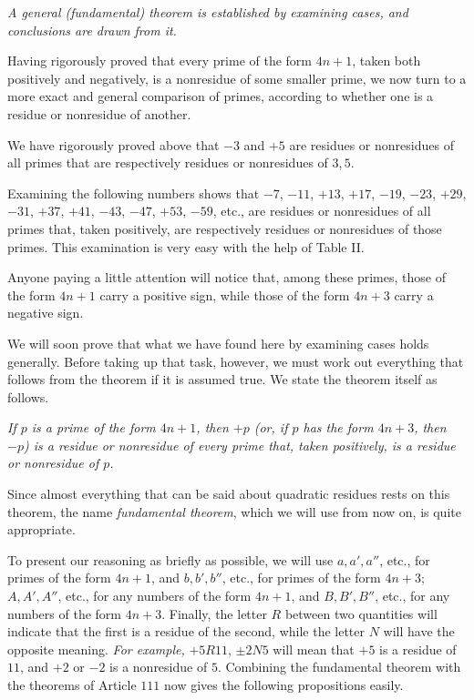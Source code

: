 \begin{center}\textit{A general (fundamental) theorem is established by examining cases, and conclusions are drawn from it.}\end{center}

Having rigorously proved that every prime of the form $4n+1$, taken both positively and negatively, is a nonresidue of some smaller prime, we now turn to a more exact and general comparison of primes, according to whether one is a residue or nonresidue of another.

We have rigorously proved above that $-3$ and $+5$ are residues or nonresidues of all primes that are respectively residues or nonresidues of $3, 5$.

Examining the following numbers shows that $-7$, $-11$, $+13$, $+17$, $-19$, $-23$, $+29$, $-31$, $+37$, $+41$, $-43$, $-47$, $+53$, $-59$, etc., are residues or nonresidues of all primes that, taken positively, are respectively residues or nonresidues of those primes. This examination is very easy with the help of Table II.

Anyone paying a little attention will notice that, among these primes, those of the form $4n+1$ carry a positive sign, while those of the form $4n+3$ carry a negative sign.

We will soon prove that what we have found here by examining cases holds generally. Before taking up that task, however, we must work out everything that follows from the theorem if it is assumed true. We state the theorem itself as follows.

\emph{If $p$ is a prime of the form $4n+1$, then $+p$ (or, if $p$ has the form $4n+3$, then $-p$) is a residue or nonresidue of every prime that, taken positively, is a residue or nonresidue of $p$.}

Since almost everything that can be said about quadratic residues rests on this theorem, the name \emph{fundamental theorem}, which we will use from now on, is quite appropriate.

To present our reasoning as briefly as possible, we will use $a, a', a''$, etc., for primes of the form $4n+1$, and $b, b', b''$, etc., for primes of the form $4n+3$; $A, A', A''$, etc., for any numbers of the form $4n+1$, and $B, B', B''$, etc., for any numbers of the form $4n+3$. Finally, the letter $R$ between two quantities will indicate that the first is a residue of the second, while the letter $N$ will have the opposite meaning. \emph{For example,} $+5R11$, $\pm 2N5$ will mean that $+5$ is a residue of $11$, and $+2$ or $-2$ is a nonresidue of $5$. Combining the fundamental theorem with the theorems of Article $111$ now gives the following propositions easily.

